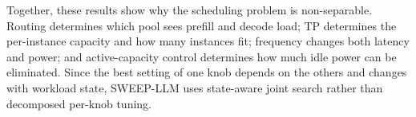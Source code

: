
Together, these results show why the scheduling problem is non-separable. 
Routing determines which pool sees prefill and decode load; TP determines the per-instance capacity and how many instances fit; frequency changes both latency and power; and active-capacity control determines how much idle power can be eliminated.
Since the best setting of one knob depends on the others and changes with workload state, SWEEP-LLM uses state-aware joint search rather than decomposed per-knob tuning.



